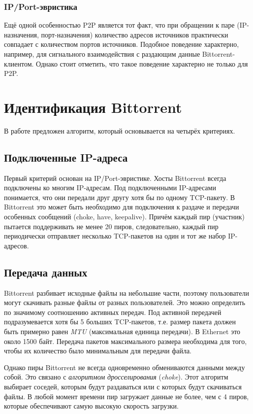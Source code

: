 \documentclass[bachelor, och, coursework]{SCWorks}
\begin{document}
\subsubsection{IP/Port-эвристика}
Ещё одной особенностью P2P является тот факт, что при обращении к паре (IP-назначения, порт-назначения)
количество адресов источников практически совпадает с количеством портов источников. Подобное поведение
характерно, например, для сигнального взаимодействия с раздающим данные Bittorrent-клиентом. Однако стоит отметить,
что такое поведение характерно не только для P2P.

\section{Идентификация Bittorrent}
В работе \cite{bittorrent} предложен алгоритм, который основывается на четырёх критериях.

\subsection{Подключенные IP-адреса}
Первый критерий основан на IP/Port-эвристике. Хосты Bittorrent всегда подключены ко многим IP-адресам.
Под подключенными IP-адресами понимается, что они передали друг другу хотя бы
по одному TCP-пакету. В Bittorrent это может быть необходимо для подключения к раздаче и передачи особенных
сообщений (choke, have, keepalive). Причём каждый пир (участник) пытается поддерживать не менее 20 пиров, следовательно,
каждый пир периодически отправляет несколько TCP-пакетов на один и тот же набор IP-адресов.

\subsection{Передача данных}
Bittorrent разбивает исходные файлы на небольшие части, поэтому пользователи могут скачивать разные файлы
от разных пользователей. Это можно определить по значимому соотношению активных передач. Под активной передачей
подразумевается хотя бы 5 больших TCP-пакетов, т.е. размер пакета должен быть примерно равен \textit{MTU} (максимальная единица передачи). В Ethernet это около 1500 байт. Передача пакетов максимального размера необходима для того, 
чтобы их количество было минимальным для передачи файла.

Однако пиры Bittorrent не всегда одновременно обмениваются данными между собой. 
Это связано с \textit{алгоритмом дросселирования} (\textit{choke}). Этот алгоритм выбирает соседей, которым будут раздаваться или с которых будут скачиваться файлы. В любой момент времени пир загружает данные не более, чем 
с 4 пиров, которые обеспечивают самую высокую скорость загрузки. %
 
\end{document}
